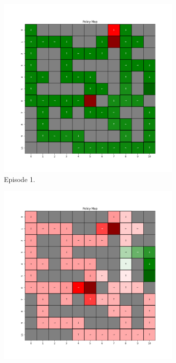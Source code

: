 \documentclass{assignment}
\begin{document}
\begin{figure}[H]
    \begin{subfigure}{0.3\textwidth}
        \includegraphics[width=\textwidth]{figures/policy_td/epsilon_sweep/policy_alpha_0.1_gamma_0.95_epsilon_0.0_iteration_1.png}
    \caption{Episode 1.}
    \end{subfigure}\hfill
    \begin{subfigure}{0.3\textwidth}
        \includegraphics[width=\textwidth]{figures/policy_td/epsilon_sweep/policy_alpha_0.1_gamma_0.95_epsilon_0.0_iteration_50.png}

\end{subfigure}
\end{figure}
\end{document}
